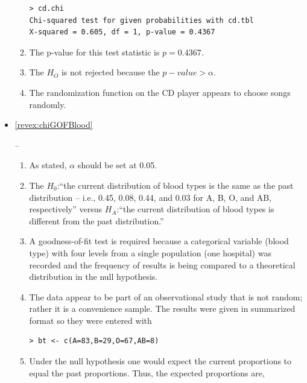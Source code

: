 \documentclass[10pt,openany]{book}\usepackage[]{graphicx}\usepackage[]{color}
\makeatletter
\newenvironment{kframe}{%
 \def\at@end@of@kframe{}%
 \ifinner\ifhmode%
  \def\at@end@of@kframe{\end{minipage}}%
  \begin{minipage}{\columnwidth}%
 \fi\fi%
 \def\FrameCommand##1{\hskip\@totalleftmargin \hskip-\fboxsep
 \colorbox{shadecolor}{##1}\hskip-\fboxsep
     \hskip-\linewidth \hskip-\@totalleftmargin \hskip\columnwidth}%
 \MakeFramed {\advance\hsize-\width
   \@totalleftmargin\z@ \linewidth\hsize
   \@setminipage}}%
 {\par\unskip\endMakeFramed%
 \at@end@of@kframe}
\newenvironment{knitrout}{}{} %
\makeatother
\begin{document}
\begin{itemize}
\begin{enumerate}
\begin{knitrout}
\begin{kframe}
\begin{verbatim}
> cd.chi
Chi-squared test for given probabilities with cd.tbl 
X-squared = 0.605, df = 1, p-value = 0.4367
\end{verbatim}
\end{kframe}
\end{knitrout}
      \item The p-value for this test statistic is $p=0.4367$.
      \item The $H_{O}$ is not rejected because the $p-value>\alpha$.
      \item The randomization function on the CD player appears to choose songs randomly.
    \end{enumerate}
  \item \hypertarget{ans:chiGOFBlood}{\ref{revex:chiGOFBlood}} --
    \begin{enumerate}
      \item As stated, $\alpha$ should be set at 0.05.
      \item The $H_{0}$:``the current distribution of blood types is the same as the past distribution -- i.e., 0.45, 0.08, 0.44, and 0.03 for A, B, O, and AB, respectively'' versus $H_{A}$:``the current distribution of blood types is different from the past distribution.''
      \item A goodness-of-fit test is required because a categorical variable (blood type) with four levels from a single population (one hospital) was recorded and the frequency of results is being compared to a theoretical distribution in the null hypothesis.
      \item The data appear to be part of an observational study that is not random; rather it is a convenience sample.  The results were given in summarized format so they were entered with
\begin{knitrout}
\color{fgcolor}\begin{kframe}
\begin{verbatim}
> bt <- c(A=83,B=29,O=67,AB=8)
\end{verbatim}
\end{kframe}
\end{knitrout}
      \item Under the null hypothesis one would expect the current proportions to equal the past proportions.  Thus, the expected proportions are,
\begin{knitrout}
\color{fgcolor}\begin{kframe}

\end{kframe}
\end{knitrout}
\end{enumerate}
\end{itemize}
\end{document}
